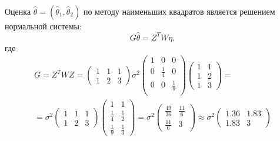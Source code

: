 \documentclass[a4paper,12pt]{article}
\begin{document}
\begin{enumerate}
          Оценка $\widehat{\theta} = (\widehat{\theta}_1, \widehat{\theta}_2)$ по методу наименьших квадратов является решением нормальной системы:
          \[
              G \widehat{\theta} = Z^T W \eta ,
          \]
          где
          \begin{multline*}
              G
              = Z^T W Z
              =
              \begin{pmatrix}
                  1 & 1 & 1 \\
                  1 & 2 & 3
              \end{pmatrix}
              \sigma^2
              \begin{pmatrix}
                  1 & 0           & 0           \\
                  0 & \frac{1}{4} & 0           \\
                  0 & 0           & \frac{1}{9} \\
              \end{pmatrix}
              \begin{pmatrix}
                  1 & 1 \\
                  1 & 2 \\
                  1 & 3
              \end{pmatrix} = \\
              = \sigma^2
              \begin{pmatrix}
                  1 & 1 & 1 \\
                  1 & 2 & 3
              \end{pmatrix}
              \begin{pmatrix}
                  1           & 1           \\
                  \frac{1}{4} & \frac{1}{2} \\
                  \frac{1}{9} & \frac{1}{3}
              \end{pmatrix}
              = \sigma^2
              \begin{pmatrix}
                  \frac{49}{36} & \frac{11}{6} \\
                  \frac{11}{6}  & 3
              \end{pmatrix}
              \approx \sigma^2
              \begin{pmatrix}
                  1.36 & 1.83 \\
                  1.83 & 3
              \end{pmatrix}
          \end{multline*}

\end{enumerate}
\end{document}
